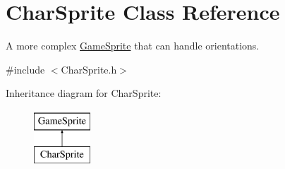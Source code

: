 \hypertarget{class_char_sprite}{}\section{Char\+Sprite Class Reference}
\label{class_char_sprite}


A more complex \mbox{\hyperlink{class_game_sprite}{Game\+Sprite}} that can handle orientations.  




{\ttfamily \#include $<$Char\+Sprite.\+h$>$}

Inheritance diagram for Char\+Sprite\+:\begin{figure}[H]
\begin{center}
\leavevmode
\includegraphics[height=2.000000cm]{class_char_sprite}
\end{center}
\end{figure}
